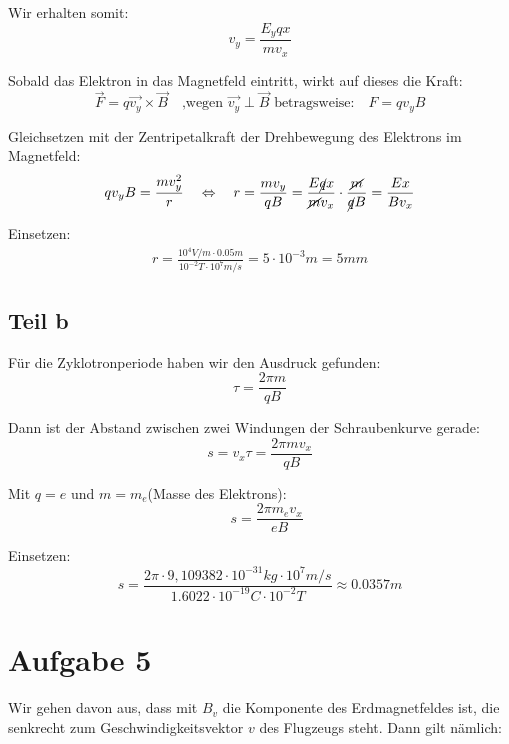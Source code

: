 \documentclass[a4paper,german,12pt,smallheadings]{scrartcl}
\begin{document}
Wir erhalten somit:
\begin{equation*}
v_y=\frac{E_yqx}{mv_x}
\end{equation*}

Sobald das Elektron in das Magnetfeld eintritt, wirkt auf dieses die Kraft:
\begin{equation*}
\vec{F}=q\vec{v_y} \times \vec{B} \quad \text{,wegen $\vec{v_y} \perp \vec{B}$ betragsweise:} \quad F=qv_yB
\end{equation*}

Gleichsetzen mit der Zentripetalkraft der Drehbewegung des Elektrons im Magnetfeld:
\begin{equation*}
qv_yB=\frac{mv_y^2}{r} \quad \Leftrightarrow \quad r=\frac{m v_y}{qB}=\frac{E\cancel{q}x}{\cancel{m}v_x} \cdot \frac{\cancel{m}}{\cancel{q}B}=\frac{Ex}{Bv_x}
\end{equation*}

Einsetzen:
\begin{align*}
r=\frac{10^4V/m \cdot 0.05m}{10^{-2}T \cdot 10^7m/s} = 5 \cdot 10^{-3}m=5mm
\end{align*}

\subsection*{Teil b}
Für die Zyklotronperiode haben wir den Ausdruck gefunden:
\begin{equation*}
\tau=\frac{2\pi m}{qB}
\end{equation*}

Dann ist der Abstand zwischen zwei Windungen der Schraubenkurve gerade:
\begin{equation*}
s=v_x\tau = \frac{2 \pi m v_x}{qB}
\end{equation*}

Mit $q=e$ und $m=m_e$(Masse des Elektrons):
\begin{equation*}
\quad s=\frac{2 \pi m_e v_x}{eB}
\end{equation*}

Einsetzen:
\begin{equation*}
s=\frac{2\pi \cdot 9,109 382\cdot 10^{-31}kg \cdot 10^7 m/s}{1.6022 \cdot 10^{-19}C \cdot 10^{-2}T} \approx 0.0357m
\end{equation*}

\section*{Aufgabe 5}
Wir gehen davon aus, dass mit $B_v$ die Komponente des Erdmagnetfeldes ist, die senkrecht zum Geschwindigkeitsvektor $v$ des Flugzeugs steht. Dann gilt nämlich:
\end{document}
